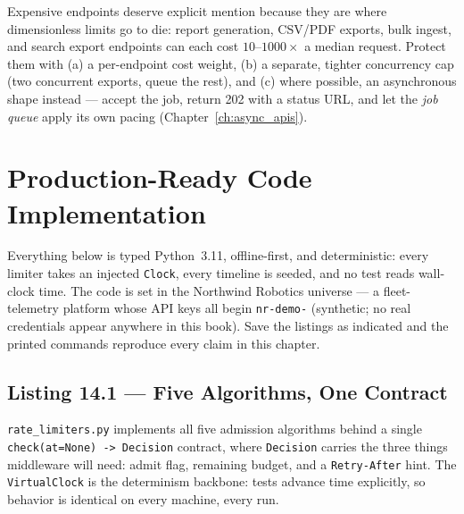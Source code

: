 Expensive endpoints deserve explicit mention because they are where
dimensionless limits go to die: report generation, CSV/PDF exports, bulk
ingest, and search export endpoints can each cost $10$--$1000\times$ a
median request. Protect them with (a) a per-endpoint cost weight, (b) a
separate, tighter concurrency cap (two concurrent exports, queue the rest),
and (c) where possible, an asynchronous shape instead --- accept the job,
return 202 with a status URL, and let the \emph{job queue} apply its own
pacing (Chapter~\ref{ch:async_apis}).
\section{Production-Ready Code Implementation}
\label{sec:ch14-code}

Everything below is typed Python~3.11, offline-first, and deterministic:
every limiter takes an injected \texttt{Clock}, every timeline is seeded,
and no test reads wall-clock time. The code is set in the Northwind
Robotics universe --- a fleet-telemetry platform whose API keys all begin
\texttt{nr-demo-} (synthetic; no real credentials appear anywhere in this
book). Save the listings as indicated and the printed commands reproduce
every claim in this chapter.

\subsection{Listing 14.1 --- Five Algorithms, One Contract}
\label{subsec:ch14-listing-limiters}

\texttt{rate\_limiters.py} implements all five admission algorithms behind a
single \texttt{check(at=None) -> Decision} contract, where
\texttt{Decision} carries the three things middleware will need: admit flag,
remaining budget, and a \texttt{Retry-After} hint. The \texttt{VirtualClock}
is the determinism backbone: tests advance time explicitly, so behavior is
identical on every machine, every run.

